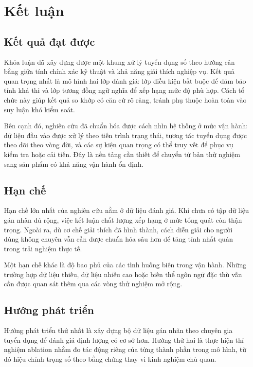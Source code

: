 \chapter*{Kết luận}

\section*{Kết quả đạt được}

Khóa luận đã xây dựng được một khung xử lý tuyển dụng số theo hướng cân bằng giữa tính chính xác kỹ thuật và khả năng giải thích nghiệp vụ. Kết quả quan trọng nhất là mô hình hai lớp đánh giá: lớp điều kiện bắt buộc để đảm bảo tính khả thi và lớp tương đồng ngữ nghĩa để xếp hạng mức độ phù hợp. Cách tổ chức này giúp kết quả so khớp có căn cứ rõ ràng, tránh phụ thuộc hoàn toàn vào suy luận khó kiểm soát.

Bên cạnh đó, nghiên cứu đã chuẩn hóa được cách nhìn hệ thống ở mức vận hành: dữ liệu đầu vào được xử lý theo tiến trình trạng thái, tương tác tuyển dụng được theo dõi theo vòng đời, và các sự kiện quan trọng có thể truy vết để phục vụ kiểm tra hoặc cải tiến. Đây là nền tảng cần thiết để chuyển từ bản thử nghiệm sang sản phẩm có khả năng vận hành ổn định.

\section*{Hạn chế}

Hạn chế lớn nhất của nghiên cứu nằm ở dữ liệu đánh giá. Khi chưa có tập dữ liệu gán nhãn đủ rộng, việc kết luận chất lượng xếp hạng ở mức tổng quát còn thận trọng. Ngoài ra, dù cơ chế giải thích đã hình thành, cách diễn giải cho người dùng không chuyên vẫn cần được chuẩn hóa sâu hơn để tăng tính nhất quán trong trải nghiệm thực tế.

Một hạn chế khác là độ bao phủ của các tình huống biên trong vận hành. Những trường hợp dữ liệu thiếu, dữ liệu nhiễu cao hoặc biến thể ngôn ngữ đặc thù vẫn cần được quan sát thêm qua các vòng thử nghiệm mở rộng.

\section*{Hướng phát triển}

Hướng phát triển thứ nhất là xây dựng bộ dữ liệu gán nhãn theo chuyên gia tuyển dụng để đánh giá định lượng có cơ sở hơn. Hướng thứ hai là thực hiện thí nghiệm ablation nhằm đo tác động riêng của từng thành phần trong mô hình, từ đó hiệu chỉnh trọng số theo bằng chứng thay vì kinh nghiệm chủ quan.

